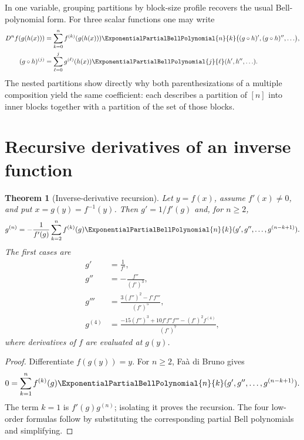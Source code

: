 \documentclass[11pt,a4paper,oneside,openany]{book}
\newtheorem{theorem}{Theorem}[chapter]
\theoremstyle{definition}
\theoremstyle{remark}
\begin{document}
In one variable, grouping partitions by block-size profile recovers the usual
Bell-polynomial form. For three scalar functions one may write
\begin{align}
 D^n f(g(h(x)))
 &=\sum_{k=0}^{n}f^{(k)}(g(h(x)))
 \ExponentialPartialBellPolynomial{n}{k}\bigl((g\circ h)',(g\circ h)'',\ldots\bigr),
 \label{unif:eq-three-composition-outer}\\
 (g\circ h)^{(j)}
 &=\sum_{\ell=0}^{j}g^{(\ell)}(h(x))
 \ExponentialPartialBellPolynomial{j}{\ell}(h',h'',\ldots).
 \label{unif:eq-three-composition-inner}
\end{align}
The nested partitions show directly why both parenthesizations of a multiple
composition yield the same coefficient: each describes a partition of $[n]$
into inner blocks together with a partition of the set of those blocks.

\section{Recursive derivatives of an inverse function}

\begin{theorem}[Inverse-derivative recursion]
\label{unif:thm-inverse-derivative-recursion}
Let $y=f(x)$, assume $f'(x)\ne0$, and put $x=g(y)=f^{-1}(y)$. Then
$g'=1/f'(g)$ and, for $n\ge2$,
\begin{equation}\label{unif:eq-inverse-derivative-recursion}
 g^{(n)}=-\frac1{f'(g)}
 \sum_{k=2}^{n}f^{(k)}(g)
 \ExponentialPartialBellPolynomial{n}{k}(g',g'',\ldots,g^{(n-k+1)}).
\end{equation}
The first cases are
\begin{align}
 g'&=\frac1{f'},\\
 g''&=-\frac{f''}{(f')^3},\\
 g'''&=\frac{3(f'')^2-f'f'''}{(f')^5},\\
 g^{(4)}&=\frac{-15(f'')^3+10f'f''f'''-(f')^2f^{(4)}}{(f')^7},
\end{align}
where derivatives of $f$ are evaluated at $g(y)$.
\end{theorem}
\begin{proof}
Differentiate $f(g(y))=y$. For $n\ge2$, Fa\`a di Bruno gives
\[
 0=\sum_{k=1}^{n}f^{(k)}(g)
 \ExponentialPartialBellPolynomial{n}{k}(g',g'',\ldots,g^{(n-k+1)}).
\]
The term $k=1$ is $f'(g)g^{(n)}$; isolating it proves the recursion. The four
low-order formulas follow by substituting the corresponding partial Bell
polynomials and simplifying.
\end{proof}
\end{document}
